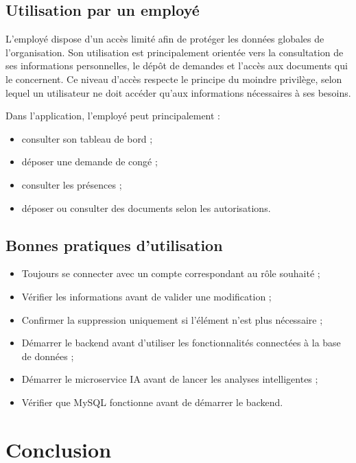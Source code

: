 \documentclass[12pt,a4paper]{report}
\begin{document}
\section{Utilisation par un employé}

L'employé dispose d'un accès limité afin de protéger les données globales de l'organisation. Son utilisation est principalement orientée vers la consultation de ses informations personnelles, le dépôt de demandes et l'accès aux documents qui le concernent. Ce niveau d'accès respecte le principe du moindre privilège, selon lequel un utilisateur ne doit accéder qu'aux informations nécessaires à ses besoins.

Dans l'application, l'employé peut principalement :

\begin{itemize}
    \item consulter son tableau de bord ;
    \item déposer une demande de congé ;
    \item consulter les présences ;
    \item déposer ou consulter des documents selon les autorisations.
\end{itemize}

\section{Bonnes pratiques d'utilisation}

\begin{itemize}
    \item Toujours se connecter avec un compte correspondant au rôle souhaité ;
    \item Vérifier les informations avant de valider une modification ;
    \item Confirmer la suppression uniquement si l'élément n'est plus nécessaire ;
    \item Démarrer le backend avant d'utiliser les fonctionnalités connectées à la base de données ;
    \item Démarrer le microservice IA avant de lancer les analyses intelligentes ;
    \item Vérifier que MySQL fonctionne avant de démarrer le backend.
\end{itemize}

\chapter{Conclusion}
\end{document}
